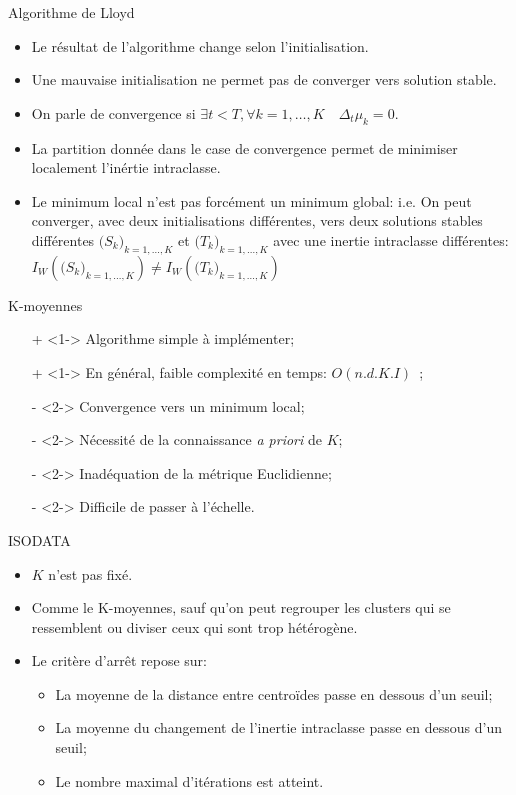 \documentclass[8pt]{beamer}
\begin{document}
			\begin{frame}{Algorithme de Lloyd}
				\begin{itemize}
					\item<1-> Le résultat de l'algorithme change selon l'initialisation.
					\item<2-> Une mauvaise initialisation ne permet pas de converger vers solution stable.
					\item<3-> On parle de convergence si \(\exists t < T,  \forall k = 1,\dots,K \quad \Delta_t\mu_k = 0\).
					\item<3-> La partition donnée dans le case de convergence permet de minimiser localement l'inértie intraclasse.
					\item<4-> Le minimum local n'est pas forcément un minimum global: i.e. On peut converger, avec deux initialisations différentes, vers deux solutions stables différentes \(\big(S_k\big)_{k=1,\dots,K}\) et \(\big(T_k\big)_{k=1,\dots,K}\) avec une inertie intraclasse différentes: \(I_W(\big(S_k\big)_{k=1,\dots,K}) \neq I_W(\big(T_k\big)_{k=1,\dots,K})\)
				\end{itemize}
			\end{frame}
			\begin{frame}{K-moyennes}
				\begin{itemize}
					\item[\color{green}+]<1-> Algorithme simple à implémenter;
					\item[\color{green}+]<1-> En général, faible complexité en temps: \(O(n.d.K.I)\)~\cite{lloyd1982least};
					\item[\color{red}-]<2-> Convergence vers un minimum local;
					\item[\color{red}-]<2-> Nécessité de la connaissance \textit{a priori} de \(K\);
					\item[\color{red}-]<2-> Inadéquation de la métrique Euclidienne;
					\item[\color{red}-]<2-> Difficile de passer à l'échelle.
				\end{itemize}
			\end{frame}
			\begin{frame}{ISODATA}
				\begin{itemize}
					\item<1-> \(K\) n'est pas fixé.
					\item<2-> Comme le K-moyennes, sauf qu'on peut regrouper les clusters qui se ressemblent ou diviser ceux qui sont trop hétérogène.
					\item<3-> Le critère d'arrêt repose sur:
						\begin{itemize}
							\item<3-> La moyenne de la distance entre centroïdes passe en dessous d'un seuil;
							\item<4-> La moyenne du changement de l'inertie intraclasse passe en dessous d'un seuil;
							\item<5-> Le nombre maximal d'itérations est atteint.
						\end{itemize}
				\end{itemize}
			\end{frame}
\end{document}
